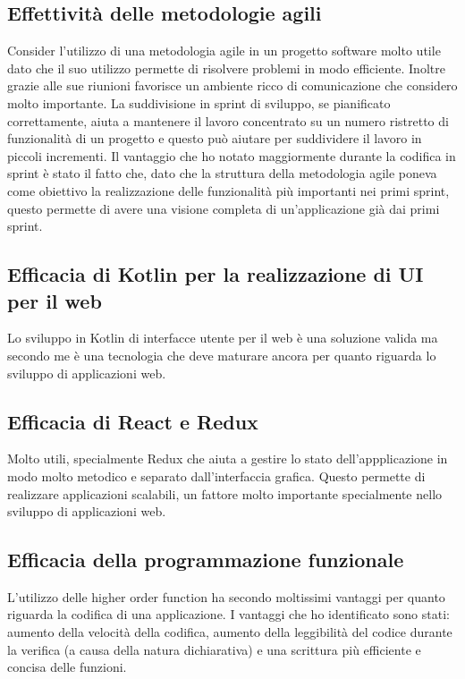 \subsection{Effettività delle metodologie agili}
Consider l'utilizzo di una metodologia agile in un progetto software molto utile dato che il suo utilizzo permette di risolvere problemi in modo efficiente. Inoltre grazie alle sue riunioni favorisce un ambiente ricco di comunicazione che considero molto importante. La suddivisione in sprint di sviluppo, se pianificato correttamente, aiuta a mantenere il lavoro concentrato su un numero ristretto di funzionalità di un progetto e questo può aiutare per suddividere il lavoro in piccoli incrementi. Il vantaggio che ho notato maggiormente durante la codifica in sprint è stato il fatto che, dato che la struttura della metodologia agile poneva come obiettivo la realizzazione delle funzionalità più importanti nei primi sprint, questo permette di avere una visione completa di un'applicazione già dai primi sprint. 

\subsection{Efficacia di Kotlin per la realizzazione di UI per il web}
Lo sviluppo in Kotlin di interfacce utente per il web è una soluzione valida ma secondo me è una tecnologia che deve maturare ancora per quanto riguarda lo sviluppo di applicazioni web.

\subsection{Efficacia di React e Redux}
Molto utili, specialmente Redux che aiuta a gestire lo stato dell'appplicazione in modo molto metodico e separato dall'interfaccia grafica. Questo permette di realizzare applicazioni scalabili, un fattore molto importante specialmente nello sviluppo di applicazioni web.

\subsection{Efficacia della programmazione funzionale}
L'utilizzo delle higher order function ha secondo moltissimi vantaggi per quanto riguarda la codifica di una applicazione. I vantaggi che ho identificato sono stati: aumento della velocità della codifica, aumento della leggibilità del codice durante la verifica (a causa della natura dichiarativa) e una scrittura più efficiente e concisa delle funzioni.